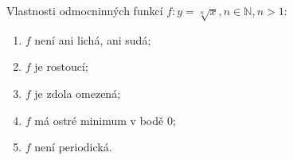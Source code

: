 \begin{veta}
    Vlastnosti odmocninných funkcí $f\colon y= \sqrt[n]{x}, n \in \mathbb N, n > 1$:
    \begin{enumerate}[$i.$]
        \item $f$ není ani lichá, ani sudá;
       	\item $f$ je rostoucí;
        \item $f$ je zdola omezená;
        \item $f$ má ostré minimum v bodě $0$;
        \item $f$ není periodická.
    \end{enumerate}
\end{veta}
